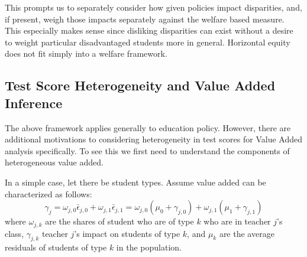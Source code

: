 \documentclass{article}
\theoremstyle{definition}
\theoremstyle{definition}
\theoremstyle{definition}
\theoremstyle{definition}
\begin{document}
    This prompts us to separately consider how given policies impact disparities, and, if present, weigh those impacts separately against the welfare based measure. This especially makes sense since disliking disparities can exist without a desire to weight particular disadvantaged students more in general. Horizontal equity does not fit simply into a welfare framework. 
    
   \subsection{Test Score Heterogeneity and Value Added Inference}
   
   
   The above framework applies generally to education policy. However, there are additional motivations to considering heterogeneity in test scores for Value Added analysis specifically. To see this we first need to understand the components of heterogeneous value added. 
   
    In a simple case, let there be student types. Assume value added can be characterized as follows:
    \[
    \gamma_j = \omega_{j,0}\bar{\epsilon}_{j,0}  + \omega_{j,1}\bar{\epsilon}_{j,1} =  \omega_{j,0}(\mu_0 +\gamma_{j,0}) + \omega_{j,1}(\mu_1 +\gamma_{j,1})
    \]
    \noindent where $\omega_{j,k}$ are the shares of student who are of type $k$ who are in teacher $j$'s class, $\gamma_{j,k}$ teacher $j$'s  impact on students of type $k$, and $\mu_k$ are the average residuals of students of type $k$ in the population.
    
\end{document}
